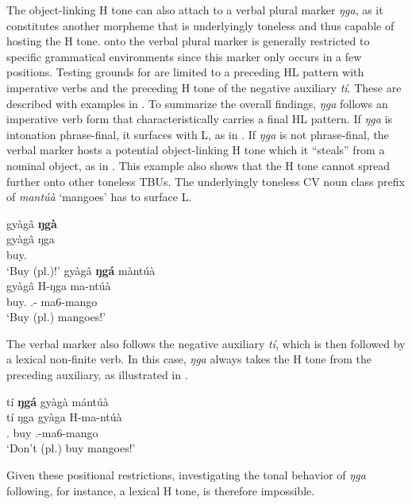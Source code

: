 The object-linking H tone can also attach to a verbal plural marker {\itshape ŋga}, as it constitutes another morpheme that is underlyingly toneless and thus capable of hosting the H tone.
{\HTS} onto the verbal plural marker is generally restricted to specific grammatical environments since this marker only occurs in a few positions. Testing grounds for {\HTS} are limited to a preceding HL pattern with imperative verbs and the preceding H tone of the negative auxiliary {\itshape tí}.  These are described with examples in . To summarize the overall findings, {\itshape ŋga} follows an  imperative verb form that characteristically carries a final HL pattern. If {\itshape ŋga} is intonation phrase-final, it surfaces with L, as in . If {\itshape ŋga} is not phrase-final, the verbal marker hosts a potential object-linking H tone which it  ``steals'' from a nominal object, as in . This example also shows that the H tone cannot spread further onto other toneless TBUs. The underlyingly toneless CV noun class prefix of {\itshape mantúà} `mangoes' has to surface L.


\ea \label{impP}
  \ea  \label{impP1}
  \glll gyàgâ {\bfseries ŋgà} \\
         gyàgâ ŋga \\
         buy.{\IMP} {\PL}\\
    \trans `Buy (pl.)!' 
\ex\label{impP2}
  \glll gyàgâ {\bfseries ŋgá} màntúà \\
         gyàgâ H-ŋga ma-ntúà \\
         buy.{\IMP} {\OBJ}.{\LINK}-{\PL} ma6-mango\\
    \trans `Buy (pl.) mangoes!' 
\z
\z


The verbal marker also follows the negative auxiliary {\itshape tí}, which is then followed by a lexical non-finite verb. In this case, {\itshape ŋga} always takes the H tone from the preceding auxiliary, as illustrated in .

\ea \label{impP3}
  \glll tí {\bfseries ŋgá} gyàgà mántúà \\
         tí ŋga gyàga H-ma-ntúà \\
         {\NEG}.{\R} {\PL} buy {\OBJ}.{\LINK}-ma6-mango\\
    \trans `Don't (pl.) buy mangoes!' 
\z


\noindent Given these positional restrictions, investigating the tonal behavior of {\itshape ŋga} following, for instance, a lexical H tone, is therefore impossible.






